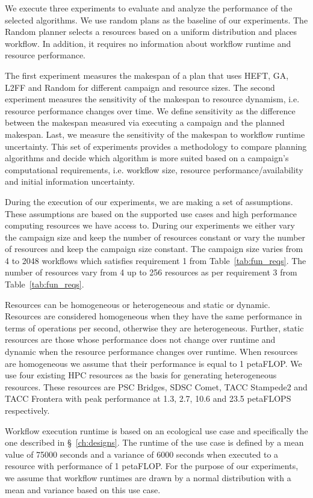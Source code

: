 We execute three experiments to evaluate and analyze the performance of the selected algorithms.
We use random plans as the baseline of  our experiments.
The Random planner selects a resources based on a uniform distribution and places workflow.
In addition, it requires no information about workflow runtime and resource performance.

The first experiment measures the makespan of a plan that uses HEFT, GA, L2FF and Random for different campaign and resource sizes.
The second experiment measures the sensitivity of the makespan to resource dynamism, i.e. resource performance changes over time.
We define sensitivity as the difference between the makespan measured via executing a campaign and the planned makespan.
Last, we measure the sensitivity of the makespan to workflow runtime uncertainty.
This set of experiments provides a methodology to compare planning algorithms and decide which algorithm is more suited based on a campaign's computational requirements, i.e. workflow size, resource performance/availability and initial information uncertainty.

During the execution of our experiments, we are making a set of assumptions.
These assumptions are based on the supported use cases and high performance computing resources we have access to.
During our experiments we either vary the campaign size and keep the number of resources constant or vary the number of resources and keep the campaign size constant.
The campaign size varies from 4 to 2048 workflows which satisfies requirement 1 from Table~\ref{tab:fun_reqs}.
The number of resources vary from 4 up to 256 resources as per requirement 3 from Table~\ref{tab:fun_reqs}.

Resources can be homogeneous or heterogeneous and static or dynamic.
Resources are considered homogeneous when they have the same performance in terms of operations per second, otherwise they are heterogeneous.
Further, static resources are those whose performance does not change over runtime and dynamic when the resource performance changes over runtime.
When resources are homogeneous we assume that their performance is equal to 1 petaFLOP.
We use four existing HPC resources as the basis for generating heterogeneous resources.
These resources are PSC Bridges, SDSC Comet, TACC Stampede2 and TACC Frontera with peak performance at 1.3, 2.7, 10.6 and 23.5 petaFLOPS respectively.

Workflow execution runtime is based on an ecological use case and specifically the one described in \S~\ref{ch:designs}.
The runtime of the use case is defined by a mean value of 75000 seconds and a variance of 6000 seconds when executed to a resource with performance of 1 petaFLOP.
For the purpose of our experiments, we assume that workflow runtimes are drawn by a normal distribution with a mean and variance based on this use case.

